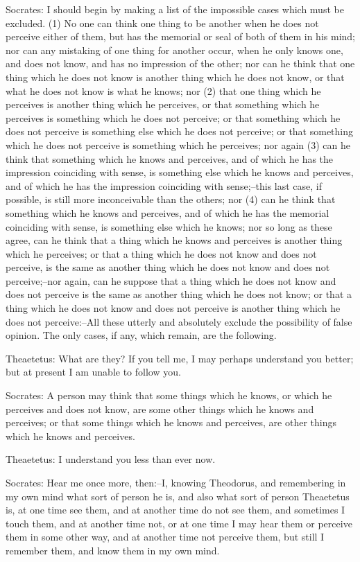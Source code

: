 Socrates: I should begin by making a list of the impossible cases which
must be excluded. (1) No one can think one thing to be another when he
does not perceive either of them, but has the memorial or seal of both
of them in his mind; nor can any mistaking of one thing for another
occur, when he only knows one, and does not know, and has no impression
of the other; nor can he think that one thing which he does not know is
another thing which he does not know, or that what he does not know
is what he knows; nor (2) that one thing which he perceives is another
thing which he perceives, or that something which he perceives is
something which he does not perceive; or that something which he does
not perceive is something else which he does not perceive; or that
something which he does not perceive is something which he perceives;
nor again (3) can he think that something which he knows and perceives,
and of which he has the impression coinciding with sense, is something
else which he knows and perceives, and of which he has the impression
coinciding with sense;--this last case, if possible, is still more
inconceivable than the others; nor (4) can he think that something which
he knows and perceives, and of which he has the memorial coinciding with
sense, is something else which he knows; nor so long as these agree,
can he think that a thing which he knows and perceives is another thing
which he perceives; or that a thing which he does not know and does not
perceive, is the same as another thing which he does not know and does
not perceive;--nor again, can he suppose that a thing which he does not
know and does not perceive is the same as another thing which he does
not know; or that a thing which he does not know and does not perceive
is another thing which he does not perceive:--All these utterly and
absolutely exclude the possibility of false opinion. The only cases, if
any, which remain, are the following.

Theaetetus: What are they? If you tell me, I may perhaps understand you
better; but at present I am unable to follow you.

Socrates: A person may think that some things which he knows, or which
he perceives and does not know, are some other things which he knows and
perceives; or that some things which he knows and perceives, are other
things which he knows and perceives.

Theaetetus: I understand you less than ever now.

Socrates: Hear me once more, then:--I, knowing Theodorus, and
remembering in my own mind what sort of person he is, and also what sort
of person Theaetetus is, at one time see them, and at another time do
not see them, and sometimes I touch them, and at another time not, or
at one time I may hear them or perceive them in some other way, and at
another time not perceive them, but still I remember them, and know them
in my own mind.

